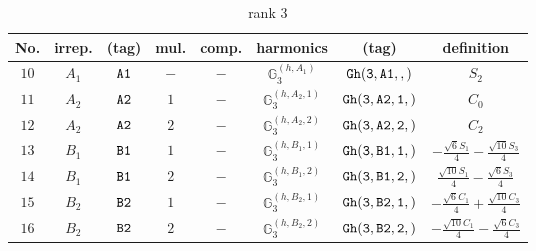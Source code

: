 \documentclass[fleqn,8pt]{jsarticle}
\begin{document}
\begin{table}[ht!]
\begin{center}
\caption{rank 3}
\renewcommand{\arraystretch}{1.3}
\begin{tabular}{cccccccc} \hline \hline
No. & irrep. & (tag) & mul. & comp. & harmonics & (tag) & definition \\ \hline
$ 10 $ & $ A_{1} $ & $ {\tt A1} $ & $ - $ & $ - $ & $ \mathbb{G}_{3}^{(h,A_{1})} $ & $ {\tt Gh(3,A1,,)} $ & $ S_{2} $ \\
$ 11 $ & $ A_{2} $ & $ {\tt A2} $ & $ 1 $ & $ - $ & $ \mathbb{G}_{3}^{(h,A_{2},1)} $ & $ {\tt Gh(3,A2,1,)} $ & $ C_{0} $ \\
$ 12 $ & $ A_{2} $ & $ {\tt A2} $ & $ 2 $ & $ - $ & $ \mathbb{G}_{3}^{(h,A_{2},2)} $ & $ {\tt Gh(3,A2,2,)} $ & $ C_{2} $ \\
$ 13 $ & $ B_{1} $ & $ {\tt B1} $ & $ 1 $ & $ - $ & $ \mathbb{G}_{3}^{(h,B_{1},1)} $ & $ {\tt Gh(3,B1,1,)} $ & $ - \frac{\sqrt{6} S_{1}}{4} - \frac{\sqrt{10} S_{3}}{4} $ \\
$ 14 $ & $ B_{1} $ & $ {\tt B1} $ & $ 2 $ & $ - $ & $ \mathbb{G}_{3}^{(h,B_{1},2)} $ & $ {\tt Gh(3,B1,2,)} $ & $ \frac{\sqrt{10} S_{1}}{4} - \frac{\sqrt{6} S_{3}}{4} $ \\
$ 15 $ & $ B_{2} $ & $ {\tt B2} $ & $ 1 $ & $ - $ & $ \mathbb{G}_{3}^{(h,B_{2},1)} $ & $ {\tt Gh(3,B2,1,)} $ & $ - \frac{\sqrt{6} C_{1}}{4} + \frac{\sqrt{10} C_{3}}{4} $ \\
$ 16 $ & $ B_{2} $ & $ {\tt B2} $ & $ 2 $ & $ - $ & $ \mathbb{G}_{3}^{(h,B_{2},2)} $ & $ {\tt Gh(3,B2,2,)} $ & $ - \frac{\sqrt{10} C_{1}}{4} - \frac{\sqrt{6} C_{3}}{4} $ \\
 \hline \hline
\end{tabular}
\end{center}
\end{table}
\end{document}
